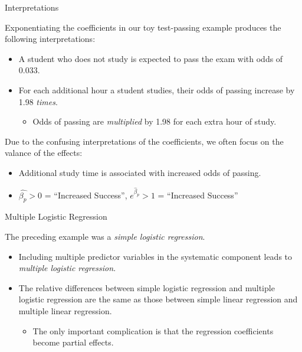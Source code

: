 \documentclass{beamer}\usepackage[]{graphicx}\usepackage[]{color}
\begin{document}

\begin{frame}{Interpretations}
  
  Exponentiating the coefficients in our toy test-passing example produces the 
  following interpretations:
  \begin{itemize}
  \item A student who does not study is expected to pass the exam with odds of 
    0.033.
  \item For each additional hour a student studies, their odds of passing
    increase by 1.98 \emph{times}.
    \begin{itemize}
    \item Odds of passing are \emph{multiplied} by 1.98 for each extra 
      hour of study.
    \end{itemize}
  \end{itemize}
    
  \vb
  \pause
  
  Due to the confusing interpretations of the coefficients, we often focus
  on the valance of the effects: 
  \begin{itemize}
  \item Additional study time is associated with increased odds of passing.
  \item $\hat{\beta_p} > 0$ = ``Increased Success'',  $e^{\hat{\beta}_p} > 1$ = 
    ``Increased Success''
  \end{itemize}
\end{frame}


\begin{frame}{Multiple Logistic Regression}
  
  The preceding example was a \emph{simple logistic regression}.
  \vc
  \begin{itemize}
  \item Including multiple predictor variables in the systematic component leads 
    to \emph{multiple logistic regression}.
    \vc
  \item The relative differences between simple logistic regression and multiple
    logistic regression are the same as those between simple linear regression
    and multiple linear regression.
    \vc
    \begin{itemize}
    \item The only important complication is that the regression coefficients 
      become partial effects.
    \end{itemize}
  \end{itemize}
  
\end{frame}
  
\end{document}

